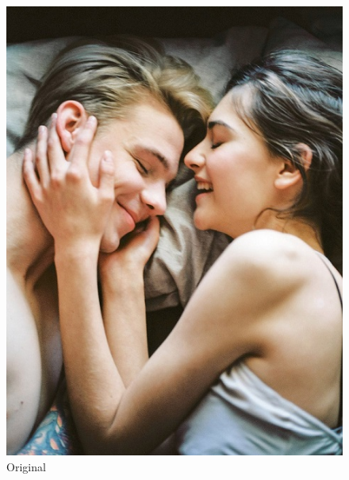 \documentclass[11pt]{article}
\begin{document}
\begin{figure}
  \includegraphics[width=\linewidth]{figures/pexels-photo-414032.jpeg}
  \caption{Original}
\end{figure}
\end{document}
